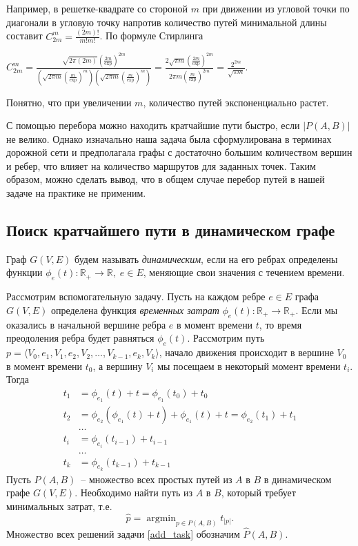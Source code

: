 \documentclass[12pt, a4paper]{article}
\DeclareMathOperator*{\argmin}{argmin}
\begin{document}
	Например, в решетке-квадрате со стороной $m$ при движении из угловой точки по диагонали в угловую точку напротив количество путей минимальной длины составит $C^m_{2m} = \frac{(2m)!}{m!m!} $. По формуле Стирлинга
	\begin{center}
		$ C^m_{2m} = \frac{\sqrt{2\pi(2m)} \left( \frac{2m}{\exp} \right)^{2m}}{\left(\sqrt{2\pi m} \left( \frac{m}{\exp} \right)^m \right)  \left(\sqrt{2\pi m} \left( \frac{m}{\exp} \right)^m \right)} = \frac{2\sqrt{\pi m} \left( \frac{2m}{\exp} \right)^{2m}}{2\pi m \left( \frac{m}{\exp} \right)^{2m}} = \frac{2^{2m}}{\sqrt{\pi m}}$.
	\end{center}
	Понятно, что при увеличении $m$, количество путей экспоненциально растет.
	
	С помощью перебора можно находить кратчайшие пути быстро, если $|P(A,B)|$ не велико. Однако изначально наша задача была сформулирована в терминах дорожной сети и предполагала графы с достаточно большим количеством вершин и ребер, что влияет на количество маршрутов для заданных точек. Таким образом, можно сделать вывод, что в общем случае перебор путей в нашей задаче на практике не применим.
	
	\newpage
	\subsection{Поиск кратчайшего пути в динамическом графе}
	
	Граф $G(V, E)$ будем называть  \textit{динамическим}, если на его ребрах определены функции $\phi_e(t) : \mathbb {R}_+ \rightarrow \mathbb {R}, \; e \in E$, меняющие свои значения с течением времени.
	
	Рассмотрим вспомогательную задачу. Пусть на каждом ребре $e \in E$ графа $G(V, E)$ определена функция \textit{временных затрат} $\phi_e(t) : \mathbb {R}_+ \rightarrow \mathbb {R}_+$. Если мы оказались в начальной вершине ребра $e$ в момент времени $t$, то время преодоления ребра будет равняться $\phi_e(t)$. Рассмотрим путь $p = \langle V_0, e_1, V_1, e_2, V_2, \dots, V_{k-1}, e_k, V_k \rangle $, начало движения происходит в вершине $V_0$ в момент времени $t_0$, а вершину $V_i$ мы посещаем в некоторый момент времени $t_i$. Тогда 
	\begin{align*}
		t_1 & = \phi_{e_1}(t) + t = \phi_{e_1}(t_0) + t_0  \\
		t_2 & = \phi_{e_2}(\phi_{e_1}(t) + t) + \phi_{e_1}(t) + t = \phi_{e_2}(t_1) + t_1 \\
		& \dots \\
		t_i & = \phi_{e_i}(t_{i-1}) + t_{i-1} \\
		& \dots \\
		t_k & = \phi_{e_k}(t_{k-1}) + t_{k-1}
	\end{align*}
	Пусть $P(A, B)$~-- множество всех простых путей из $A$ в $B$ в динамическом графе $G(V, E)$. Необходимо найти путь из $A$ в $B$, который требует минимальных затрат, т.е. 
	\begin{equation}
		\label{add_task}
		\widehat{p} = \argmin_{p \in P(A, B)} t_{|p|}.
	\end{equation}
	Множество всех решений задачи \eqref{add_task} обозначим $\widehat{P}(A, B)$.
	
\end{document}
